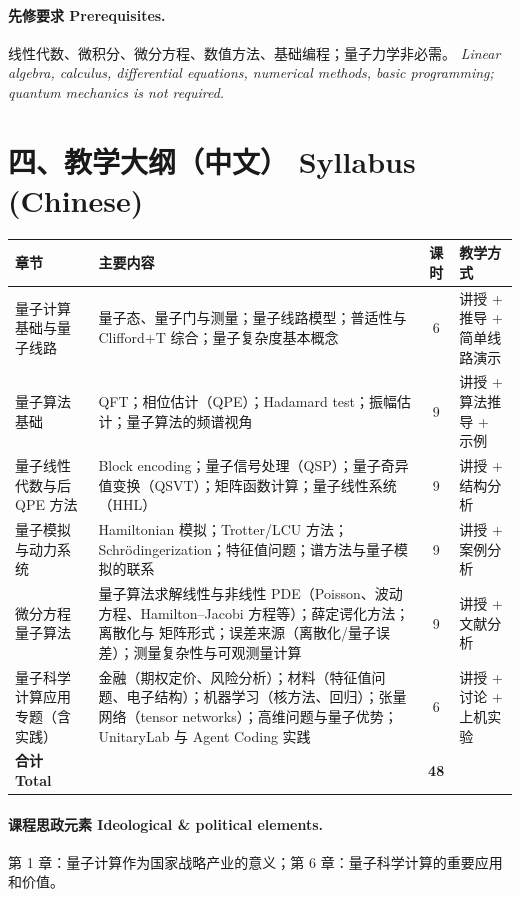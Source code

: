\documentclass[UTF8,11pt]{ctexart}
\begin{document}
\paragraph{先修要求 Prerequisites.}
线性代数、微积分、微分方程、数值方法、基础编程；量子力学非必需。\quad
\textit{Linear algebra, calculus, differential equations, numerical methods, basic programming;
quantum mechanics is not required.}

\section*{四、教学大纲（中文） \quad Syllabus (Chinese)}
\renewcommand{\arraystretch}{1.2}
\begin{tabularx}{\textwidth}{@{}p{3.2cm} Y c p{3.1cm}@{}}
\toprule
\textbf{章节} & \textbf{主要内容} & \textbf{课时} & \textbf{教学方式} \\
\midrule
量子计算基础与量子线路 &
量子态、量子门与测量；量子线路模型；普适性与 Clifford+T 综合；量子复杂度基本概念 &
6 & 讲授 + 推导 + 简单线路演示 \\
量子算法基础 &
QFT；相位估计（QPE）；Hadamard test；振幅估计；量子算法的频谱视角 &
9 & 讲授 + 算法推导 + 示例 \\
量子线性代数与后 QPE 方法 &
Block encoding；量子信号处理（QSP）；量子奇异值变换（QSVT）；矩阵函数计算；量子线性系统（HHL） &
9 & 讲授 + 结构分析 \\
量子模拟与动力系统 &
Hamiltonian 模拟；Trotter/LCU 方法；Schr\"odingerization；特征值问题；谱方法与量子模拟的联系 &
9 & 讲授 + 案例分析 \\
微分方程量子算法 &
量子算法求解线性与非线性 PDE（Poisson、波动方程、Hamilton--Jacobi 方程等）；薛定谔化方法；离散化与
矩阵形式；误差来源（离散化/量子误差）；测量复杂性与可观测量计算 &
9 & 讲授 + 文献分析 \\
量子科学计算应用专题（含实践） &
金融（期权定价、风险分析）；材料（特征值问题、电子结构）；机器学习（核方法、回归）；张量网络（tensor networks）；高维问题与量子优势；
UnitaryLab 与 Agent Coding 实践 &
6 & 讲授 + 讨论 + 上机实验 \\
\midrule
\textbf{合计 Total} & & \textbf{48} & \\
\bottomrule
\end{tabularx}

\paragraph{课程思政元素 Ideological \& political elements.}
第 1 章：量子计算作为国家战略产业的意义；第 6 章：量子科学计算的重要应用和价值。
\end{document}
